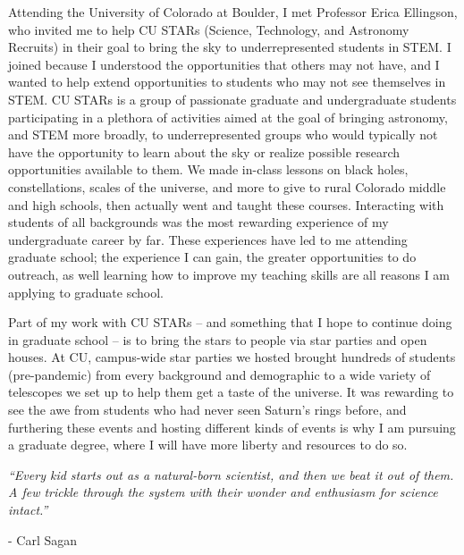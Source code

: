 \documentclass[11pt,letterpaper]{article}
\begin{document}
Attending the University of Colorado at Boulder, I met Professor Erica Ellingson, who invited me to help CU STARs (Science, Technology, and Astronomy Recruits) in their goal to bring the sky to underrepresented students in STEM. I joined because I understood the opportunities that others may not have, and I wanted to help extend opportunities to students who may not see themselves in STEM. CU STARs is a group of passionate graduate and undergraduate students participating in a plethora of activities aimed at the goal of bringing astronomy, and STEM more broadly, to underrepresented groups who would typically not have the opportunity to learn about the sky or realize possible research opportunities available to them. We made in-class lessons on black holes, constellations, scales of the universe, and more to give to rural Colorado middle and high schools, then actually went and taught these courses. Interacting with students of all backgrounds was the most rewarding experience of my undergraduate career by far. These experiences have led to me attending graduate school; the experience I can gain, the greater opportunities to do outreach, as well learning how to improve my teaching skills are all reasons I am applying to graduate school. 

Part of my work with CU STARs -- and something that I hope to continue doing in graduate school -- is to bring the stars to people via star parties and open houses. At CU, campus-wide star parties we hosted brought hundreds of students (pre-pandemic) from every background and demographic to a wide variety of telescopes we set up to help them get a taste of the universe. It was rewarding to see the awe from students who had never seen Saturn's rings before, and furthering these events and hosting different kinds of events is why I am pursuing a graduate degree, where I will have more liberty and resources to do so. 


\textit{“Every kid starts out as a natural-born scientist, and then we beat it out of them. A few trickle through the system with their wonder and enthusiasm for science intact.”}

- Carl Sagan
\end{document}

